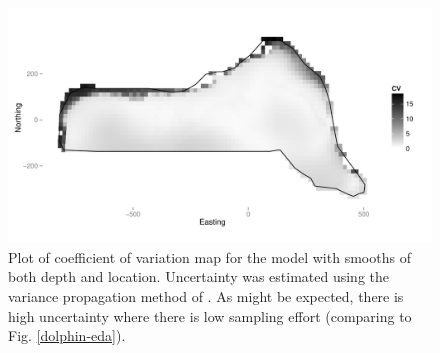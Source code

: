 \documentclass[a4paper,12pt]{article}
\begin{document}
\begin{figure}[h!]
  \caption{Plot of coefficient of variation map for the model with smooths of both depth and location. Uncertainty was estimated using the variance propagation method of \cite{WILLIAMS:2011in}. As might be expected, there is high uncertainty where there is low sampling effort (comparing to Fig. \ref{dolphin-eda}).}
  \label{cv-plot}
  \begin{center}
    \includegraphics[width=\textwidth]{figs/cvplot-varprop}
  \end{center}
\end{figure}

\newpage
\end{document}
